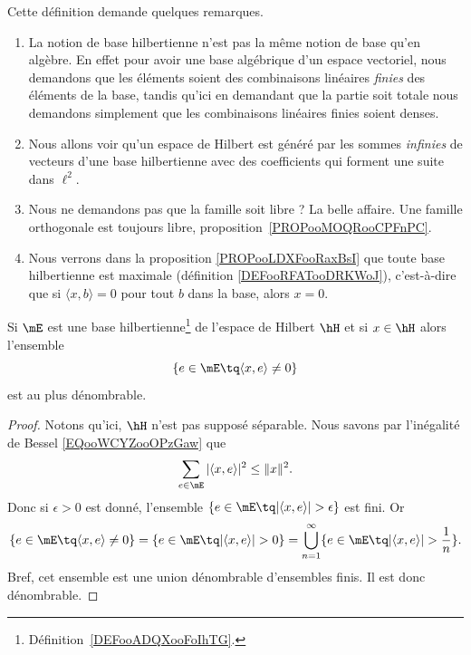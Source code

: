 \begin{normaltext}
	Cette définition demande quelques remarques.

	\begin{enumerate}
		\item
		      La notion de base hilbertienne n'est pas la même notion de base qu'en algèbre. En effet pour avoir une base algébrique d'un espace vectoriel, nous demandons que les éléments soient des combinaisons linéaires \emph{finies} des éléments de la base, tandis qu'ici en demandant que la partie soit totale nous demandons simplement que les combinaisons linéaires finies soient denses.
		\item
		      Nous allons voir qu'un espace de Hilbert est généré par les sommes \emph{infinies} de vecteurs d'une base hilbertienne avec des coefficients qui forment une suite dans \( \ell^2\).
		\item
		      Nous ne demandons pas que la famille soit libre ? La belle affaire. Une famille orthogonale est toujours libre, proposition~\ref{PROPooMOQRooCPFnPC}.
		\item
		      Nous verrons dans la proposition \ref{PROPooLDXFooRaxBsI} que toute base hilbertienne est maximale (définition \ref{DEFooRFATooDRKWoJ}), c'est-à-dire que si \( \langle x, b\rangle =0\) pour tout \( b\) dans la base, alors \( x=0\).
	\end{enumerate}
\end{normaltext}

\begin{lemma}       \label{LEMooHWOBooQJKdTD}
	Si \( \mE\) est une base hilbertienne\footnote{Définition~\ref{DEFooADQXooFoIhTG}.} de l'espace de Hilbert \( \hH\) et si \( x\in \hH\) alors l'ensemble
	\begin{equation}
		\{ e\in\mE\tq \langle x, e\rangle \neq 0 \}
	\end{equation}
	est au plus dénombrable.
\end{lemma}

\begin{proof}
	Notons qu'ici, \( \hH\) n'est pas supposé séparable. Nous savons par l'inégalité de Bessel \eqref{EQooWCYZooOPzGaw} que
	\begin{equation}
		\sum_{e\in\mE}| \langle x, e\rangle  |^2\leq \| x \|^2.
	\end{equation}
	Donc si \( \epsilon>0\) est donné, l'ensemble \( \{ e\in \mE\tq| \langle x, e\rangle  |>\epsilon \}\) est fini. Or
	\begin{equation}
		\{ e\in\mE\tq \langle x, e\rangle \neq 0  \}=\{ e\in\mE\tq| \langle x, e\rangle  |>0 \}=\bigcup_{n=1}^{\infty}\{ e\in\mE\tq | \langle x, e\rangle  |>\frac{1}{ n } \}.
	\end{equation}
	Bref, cet ensemble est une union dénombrable d'ensembles finis. Il est donc dénombrable.
\end{proof}

